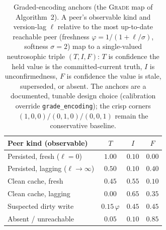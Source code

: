 \documentclass[11pt]{article}
\begin{document}
\begin{table}[t]\centering
\caption{Graded-encoding anchors (the \textsc{Grade} map of Algorithm~2). A peer's
observable kind and version-lag $\ell$ relative to the most up-to-date reachable peer (freshness
$\varphi=1/(1+\ell/\sigma)$, softness $\sigma=2$) map to a single-valued neutrosophic triple $(T,I,F)$:
$T$ is confidence the held value is the committed-current truth, $I$ is unconfirmedness, $F$ is
confidence the value is stale, superseded, or absent. The anchors are a documented, tunable design choice
(calibration override \texttt{grade\_encoding}); the crisp corners $(1,0,0)/(0,1,0)/(0,0,1)$ remain the
conservative baseline.}
\label{tab:grade}
\small
\begin{tabular}{@{}lccc@{}}
\toprule
Peer kind (observable) & $T$ & $I$ & $F$ \\
\midrule
Persisted, fresh ($\ell=0$)          & $1.00$ & $0.10$ & $0.00$ \\
Persisted, lagging ($\ell\to\infty$) & $0.50$ & $0.10$ & $0.40$ \\
Clean cache, fresh                   & $0.45$ & $0.55$ & $0.10$ \\
Clean cache, lagging                 & $0.00$ & $0.65$ & $0.35$ \\
Suspected dirty write                & $0.15\,\varphi$ & $0.45$ & $0.45$ \\
Absent / unreachable                 & $0.05$ & $0.10$ & $0.85$ \\
\bottomrule
\end{tabular}
\end{table}



\end{document}
